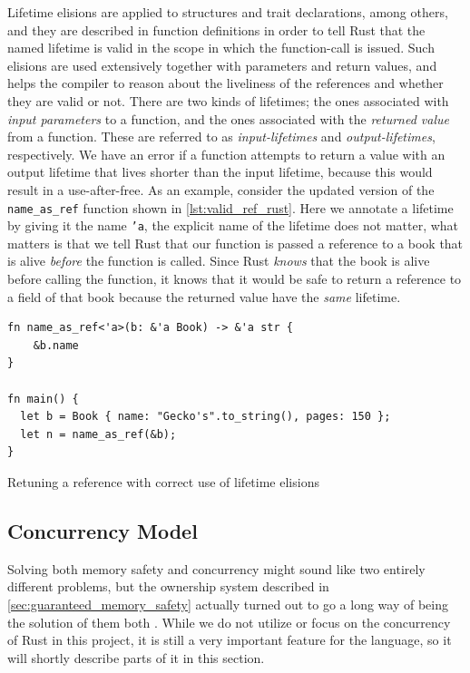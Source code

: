 Lifetime elisions are applied to structures and trait declarations, among others, and they are described in function definitions in order to tell Rust that the named lifetime is valid in the scope in which the function-call is issued.
Such elisions are used extensively together with parameters and return values, and helps the compiler to reason about the liveliness of the references and whether they are valid or not.
There are two kinds of lifetimes; the ones associated with \emph{input parameters} to a function, and the ones associated with the \emph{returned value} from a function.
These are referred to as \emph{input-lifetimes} and \emph{output-lifetimes}, respectively.
We have an error if a function attempts to return a value with an output lifetime that lives shorter than the input lifetime, because this would result in a use-after-free.
As an example, consider the updated version of the \texttt{name\_as\_ref} function shown in \autoref{lst:valid_ref_rust}.
Here we annotate a lifetime by giving it the name \texttt{'a}, the explicit name of the lifetime does not matter, what matters is that we tell Rust that our function is passed a reference to a book that is alive \emph{before} the function is called.
Since Rust \emph{knows} that the book is alive before calling the function, it knows that it would be safe to return a reference to a field of that book because the returned value have the \emph{same} lifetime.

\begin{listing}[tb]
\begin{verbatim}
fn name_as_ref<'a>(b: &'a Book) -> &'a str {
    &b.name
}

fn main() {
  let b = Book { name: "Gecko's".to_string(), pages: 150 };
  let n = name_as_ref(&b);
}
\end{verbatim}
\caption{Retuning a reference with correct use of lifetime elisions}
\label{lst:valid_ref_rust}
\end{listing}

\subsection{Concurrency Model} %
\label{ssub:concurrency_model}

Solving both memory safety and concurrency might sound like two entirely different problems, but the ownership system described in \autoref{sec:guaranteed_memory_safety} actually turned out to go a long way of being the solution of them both \cite{web:fearless_concurrency_with_rust}.
While we do not utilize or focus on the concurrency of Rust in this project, it is still a very important feature for the language, so it will shortly describe parts of it in this section.

